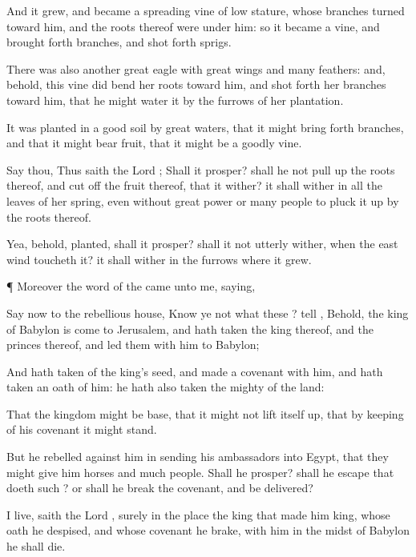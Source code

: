 {And it
grew, and became a
spreading
vine of
low
stature, whose
branches
turned toward him, and the
roots thereof were under him: so it became a
vine, and brought
forth
branches, and
shot forth
sprigs.

There was also
another
great
eagle with
great
wings and
many
feathers: and, behold, this
vine did
bend her
roots toward him, and shot
forth her
branches toward him, that he might
water it by the
furrows of her
plantation.

It was
planted in a
good
soil by
great
waters, that it might bring
forth
branches, and that it might
bear
fruit, that it might be a
goodly
vine.

Say thou, Thus
saith the
Lord
{}; Shall it
prosper? shall he not pull
up the
roots thereof, and cut
off the
fruit thereof, that it
wither? it shall
wither in all the
leaves of her
spring, even without
great
power or
many
people to pluck it
up by the
roots thereof.

Yea, behold,
{}
planted, shall it
prosper? shall it not
utterly
wither, when the
east
wind
toucheth it? it shall
wither in the
furrows where it
grew.


\par }{\PP {}¶ Moreover the
word of the
{} came unto me,
saying,

Say now to the
rebellious
house,
Know ye not what these
{}?
tell
{}, Behold, the
king of
Babylon is
come to
Jerusalem, and hath
taken the
king thereof, and the
princes thereof, and
led them with him to
Babylon;

And hath
taken of the
king’s
seed, and
made a
covenant with him, and hath
taken an
oath of him: he hath also
taken the
mighty of the
land:

That the
kingdom might be
base, that it might not lift itself
up,
{} that by
keeping of his
covenant it might
stand.

But he
rebelled against him in
sending his
ambassadors into
Egypt, that they might
give him
horses and
much
people. Shall he
prosper? shall he
escape that
doeth such
{}? or shall he
break the
covenant, and be
delivered?

 I
live,
saith the
Lord
{}, surely in the
place
{} the
king
{} that made him
king, whose
oath he
despised, and whose
covenant he
brake,
{} with him in the
midst of
Babylon he shall
die.

}
